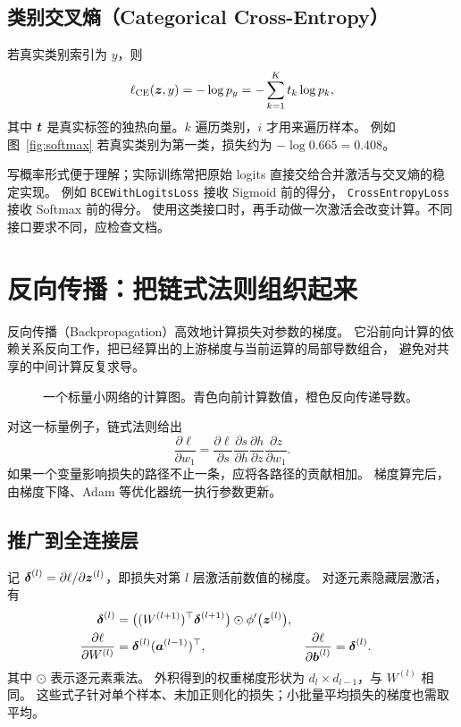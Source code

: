 \subsection{类别交叉熵（Categorical Cross-Entropy）}
若真实类别索引为 $y$，则
\begin{equation}
 \ell_{\mathrm{CE}}(\boldsymbol{z},y)=-\log p_y
       =-\sum_{k=1}^K t_k\log p_k,
 \label{eq:ce}
\end{equation}
其中 $\boldsymbol{t}$ 是真实标签的独热向量。$k$ 遍历类别，$i$ 才用来遍历样本。
例如图~\ref{fig:softmax} 若真实类别为第一类，损失约为 $-\log0.665=0.408$。

\begin{pitfall}[公式里的概率与程序接口里的输入]
写概率形式便于理解；实际训练常把原始 logits 直接交给合并激活与交叉熵的稳定实现。
例如 \texttt{BCEWithLogitsLoss} 接收 Sigmoid 前的得分，
\texttt{CrossEntropyLoss} 接收 Softmax 前的得分。
使用这类接口时，再手动做一次激活会改变计算。不同接口要求不同，应检查文档。
\end{pitfall}

\section{反向传播：把链式法则组织起来}
\label{sec:nn-backprop}

反向传播（Backpropagation）高效地计算损失对参数的梯度。
它沿前向计算的依赖关系反向工作，把已经算出的上游梯度与当前运算的局部导数组合，
避免对共享的中间计算反复求导。

\begin{figure}[htbp]
\centering

\caption{一个标量小网络的计算图。青色向前计算数值，橙色反向传递导数。}
\label{fig:backprop}
\par\smallskip
{}
\end{figure}

对这一标量例子，链式法则给出
\[
 \frac{\partial\ell}{\partial w_1}
 =\frac{\partial\ell}{\partial s}
  \frac{\partial s}{\partial h}
  \frac{\partial h}{\partial z}
  \frac{\partial z}{\partial w_1}.
\]
如果一个变量影响损失的路径不止一条，应将各路径的贡献相加。
梯度算完后，由梯度下降、Adam 等优化器统一执行参数更新。

\subsection{推广到全连接层}
记 $\boldsymbol{\delta}^{(l)}=\partial\ell/\partial\boldsymbol{z}^{(l)}$，即损失对第 $l$ 层激活前数值的梯度。
对逐元素隐藏层激活，有
\begin{align}
 \boldsymbol{\delta}^{(l)}&=
 \bigl((W^{(l+1)})^\top\boldsymbol{\delta}^{(l+1)}\bigr)
 \odot\phi'\bigl(\boldsymbol{z}^{(l)}\bigr),\label{eq:backward}\\
 \frac{\partial\ell}{\partial W^{(l)}}&=
 \boldsymbol{\delta}^{(l)}(\boldsymbol{a}^{(l-1)})^\top,
 &\frac{\partial\ell}{\partial\boldsymbol{b}^{(l)}}&=\boldsymbol{\delta}^{(l)}.
 \label{eq:nn-gradients}
\end{align}
其中 $\odot$ 表示逐元素乘法。
外积得到的权重梯度形状为 $d_l\times d_{l-1}$，与 $W^{(l)}$ 相同。
这些式子针对单个样本、未加正则化的损失；小批量平均损失的梯度也需取平均。

